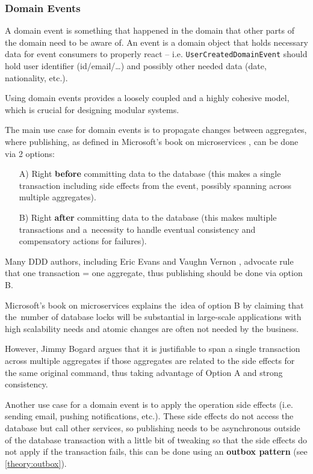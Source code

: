 \newpage
\subsubsection{Domain Events}
 A domain event is something that happened in the domain that other parts of the domain need to be aware of. An event is a domain object that holds necessary data for event consumers to properly react -- i.e. \texttt{UserCreatedDomainEvent} should hold user identifier (id/email/\dots) and possibly other needed data (date, nationality, etc.).
 
 Using domain events provides a loosely coupled and a highly cohesive model, which is crucial for designing modular systems.

The main use case for domain events is to propagate changes between aggregates, where publishing, as defined in Microsoft's book on microservices \cite{ms:microservices}, can be done via 2 options:
\begin{enumerate}
    \item[A)] Right \textbf{before} committing data to the database (this makes a single transaction including side effects from the event, possibly spanning across multiple aggregates).
    \item[B)] Right \textbf{after} committing data to the database (this makes multiple transactions and a~necessity to handle eventual consistency and compensatory actions for failures).
\end{enumerate}

Many DDD authors, including Eric Evans \cite{eric_evans:ddd} and Vaughn Vernon \cite{vv:aggregates}, advocate rule that one transaction = one aggregate, thus publishing should be done via option B.

Microsoft's book on microservices \cite{ms:microservices} explains the~idea of option B by claiming that the~number of database locks will be substantial in large-scale applications with high scalability needs and atomic changes are often not needed by the business.

However, Jimmy Bogard \cite{jimmy_bogard:domain_events} argues that it is justifiable to span a single transaction across multiple aggregates if those aggregates are related to the side effects for the same original command, thus taking advantage of Option A and strong consistency.

Another use case for a domain event is to apply the operation side effects (i.e. sending email, pushing notifications, etc.). These side effects do not access the database but call other services, so publishing needs to be asynchronous outside of the database transaction with a little bit of tweaking so that the side effects do not apply if the transaction fails, this can be done using an \textbf{outbox pattern} (see \ref{theory:outbox}).

